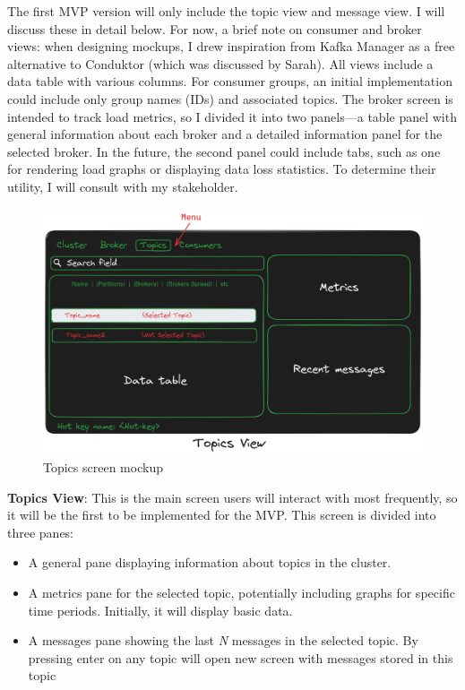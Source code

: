 \documentclass[10pt , a4paper]{report}
\begin{document}
The first MVP version will only include the topic view and message view. I will discuss these in detail below. For now, a brief note on consumer and broker views: when designing mockups, I drew inspiration from Kafka Manager as a free alternative to Conduktor (which was discussed by Sarah). All views include a data table with various columns. For consumer groups, an initial implementation could include only group names (IDs) and associated topics. The broker screen is intended to track load metrics, so I divided it into two panels—a table panel with general information about each broker and a detailed information panel for the selected broker. In the future, the second panel could include tabs, such as one for rendering load graphs or displaying data loss statistics. To determine their utility, I will consult with my stakeholder.

\begin{figure}[htbp]
    \centering
    \includegraphics[width=.8\linewidth]{imgs/TopicsScreenDesign.png}
    \caption{Topics screen mockup}
    \label{fig:topics_screen_maquette}
\end{figure}

\textbf{Topics View}: This is the main screen users will interact with most frequently, so it will be the first to be implemented for the MVP. This screen is divided into three panes:
\begin{itemize}
    \item A general pane displaying information about topics in the cluster.
    \item A metrics pane for the selected topic, potentially including graphs for specific time periods. Initially, it will display basic data.
    \item A messages pane showing the last \textit{N} messages in the selected topic. By pressing enter on any topic will open new screen with messages stored in this topic 
\end{itemize}
\end{document}
